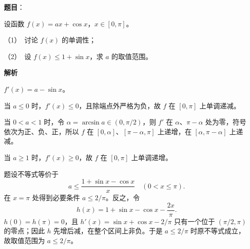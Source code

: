\begin{answer}

\textbf{题目}：

设函数 $f(x)=ax+\cos x$，$x\in[0,\pi]$。

（1）　讨论 $f(x)$ 的单调性；

（2）　设 $f(x)\leqslant1+\sin x$，求 $a$ 的取值范围。

\textbf{解析}


$f'(x)=a-\sin x$。

当 $a\leqslant0$ 时，$f'(x)\leqslant0$，且除端点外严格为负，故 $f$ 在 $[0,\pi]$ 上单调递减。

当 $0<a<1$ 时，令 $\alpha=\arcsin a\in(0,\pi/2)$，则 $f'$ 在 $\alpha$、$\pi-\alpha$ 处为零，符号依次为正、负、正，所以 $f$ 在 $[0,\alpha]$、$[\pi-\alpha,\pi]$ 上递增，在 $[\alpha,\pi-\alpha]$ 上递减。

当 $a\geqslant1$ 时，$f'(x)\geqslant0$，故 $f$ 在 $[0,\pi]$ 上单调递增。


题设不等式等价于
\nopagebreak[4]
\[
a\leqslant\frac{1+\sin x-\cos x}{x}\quad(0<x\leqslant\pi).
\]
在 $x=\pi$ 处得到必要条件 $a\leqslant2/\pi$。反之，令
\nopagebreak[4]
\[
h(x)=1+\sin x-\cos x-\frac{2x}{\pi}.
\]
$h(0)=h(\pi)=0$，且 $h'(x)=\sin x+\cos x-2/\pi$ 只有一个位于 $(\pi/2,\pi)$ 的零点；因此 $h$ 先增后减，在整个区间上非负。于是 $a\leqslant2/\pi$ 时原不等式成立，故取值范围为 $a\leqslant2/\pi$。



\end{answer}
